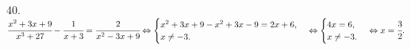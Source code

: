 40. $\cfrac{x^2+3x+9}{x^3+27}-\cfrac{1}{x+3}=\cfrac{2}{x^2-3x+9}\Leftrightarrow \begin{cases}x^2+3x+9-x^2+3x-9=2x+6,\\ x\neq-3.\end{cases}
\Leftrightarrow\begin{cases} 4x=6,\\ x\neq-3.\end{cases}\Leftrightarrow x=\cfrac{3}{2}.$\\
